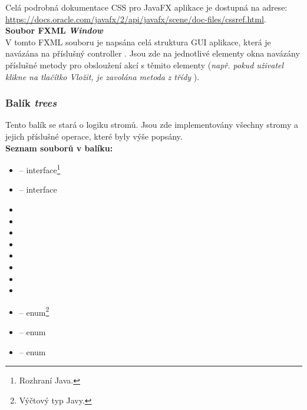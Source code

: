 \documentclass[
  biblatex=false,
  font=serif,
  glossaries=false,
  tables=false,
  theorems=false,
  index
]{kidiplom}
\begin{document}
\noindent Celá podrobná dokumentace CSS pro JavaFX aplikace je dostupná na adrese: \\
\url{https://docs.oracle.com/javafx/2/api/javafx/scene/doc-files/cssref.html}.\\

\noindent \textbf{Soubor FXML \textit{Window}}\\
\indent V tomto FXML souboru je napsána celá struktura GUI aplikace, která je navázána na příslušný controller . Jsou zde na jednotlivé elementy okna navázány příslušné metody pro obsloužení akcí s těmito elementy (\textit{např. pokud uživatel klikne na tlačítko Vložit, je zavolána metoda}  \textit{z třídy} ).

\subsubsection{Balík \textit{trees}}
\indent\indent Tento balík se stará o logiku stromů. Jsou zde implementovány všechny stromy a jejich příslušné operace, které byly výše popsány.\\

\noindent \textbf{Seznam souborů v balíku:}
\begin{itemize}
\item {} -- interface\footnote{Rozhraní Java.}
\item {} -- interface
\item {}
\item {}
\item {}
\item {}
\item {}
\item {}
\item {}
\item {}
\item {} -- enum\footnote{Výčtový typ Javy.}
\item {} -- enum
\item {} -- enum
\end{itemize}
\end{document}
